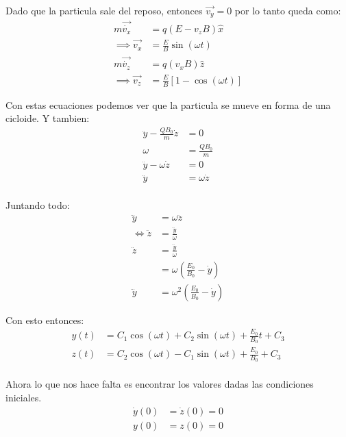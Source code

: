 \documentclass{report}
\begin{document}
Dado que la particula sale del reposo, entonces $\vec{v_y} = 0$ por lo tanto queda como:
\begin{align*}
	m\vec{\dot{v_x}} &= q \left(E - v_z B\right) \hat{x} \\
  \implies\vec{v_x} &= \frac{E}{B} \sin \left( \omega t\right)\\
	m\vec{\dot{v_z}} &= q \left( v_x B \right) \hat{z} \\
  \implies \vec{v_z} &= \frac{E}{B} \left[ 1 - \cos\left( \omega t\right)\right]
\end{align*}

Con estas ecuaciones podemos ver que la particula se mueve en forma de una cicloide.
Y tambien:
\begin{align*}
	\ddot{y} - \frac{Q B_0}{m} \dot{z} &= 0\\
	\omega &= \frac{Q B_0}{m}\\
	\ddot{y} - \omega \dot{z} &= 0\\
	\ddot{y} &= \omega \dot{z}\\
\end{align*}

Juntando todo:
\begin{align*}
	\dddot{y} &= \omega \ddot{z} \\
	\iff \ddot{z} &= \frac{\dddot{y}}{\omega}\\
	\ddot{z} &= \frac{\dddot{y}}{\omega}\\
	&= \omega \left( \frac{E_0}{B_0} - \dot{y} \right)\\
	\dddot{y} &= \omega^2 \left( \frac{E_0}{B_0} - \dot{y} \right)
\end{align*}

Con esto entonces:
\begin{align*}
	y(t) &= C_1 \cos \left(\omega t \right) + C_2 \sin\left( \omega t \right) + \frac{E_0}{B_0} t + C_3\\
	z(t) &= C_2 \cos \left(\omega t \right) - C_1 \sin\left( \omega t \right) + \frac{E_0}{B_0} + C_3\\
\end{align*}

Ahora lo que nos hace falta es encontrar los valores dadas las condiciones iniciales.
\begin{align*}
	\dot{y} (0) &= \dot{z} (0) = 0\\
	y(0) &= z(0) = 0
\end{align*}
\end{document}
